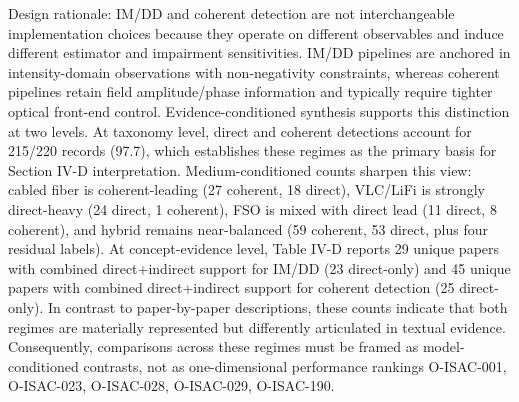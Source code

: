 {}\markdownRendererInterblockSeparator
{}\markdownRendererSectionBegin
{}\markdownRendererInterblockSeparator
{}Design rationale: IM/DD and coherent detection are not interchangeable implementation choices because they operate on different observables and induce different estimator and impairment sensitivities. IM/DD pipelines are anchored in intensity-domain observations with non-negativity constraints, whereas coherent pipelines retain field amplitude/phase information and typically require tighter optical front-end control.\markdownRendererParagraphSeparator
{}Evidence-conditioned synthesis supports this distinction at two levels. At taxonomy level, direct and coherent detections account for 215/220 records (97.7\markdownRendererPercentSign{}), which establishes these regimes as the primary basis for Section IV-D interpretation. Medium-conditioned counts sharpen this view: cabled fiber is coherent-leading (27 coherent, 18 direct), VLC/LiFi is strongly direct-heavy (24 direct, 1 coherent), FSO is mixed with direct lead (11 direct, 8 coherent), and hybrid remains near-balanced (59 coherent, 53 direct, plus four residual labels). At concept-evidence level, Table IV-D reports 29 unique papers with combined direct+indirect support for IM/DD (23 direct-only) and 45 unique papers with combined direct+indirect support for coherent detection (25 direct-only). In contrast to paper-by-paper descriptions, these counts indicate that both regimes are materially represented but differently articulated in textual evidence. Consequently, comparisons across these regimes must be framed as model-conditioned contrasts, not as one-dimensional performance rankings O-ISAC-001, O-ISAC-023, O-ISAC-028, O-ISAC-029, O-ISAC-190.\markdownRendererParagraphSeparator
